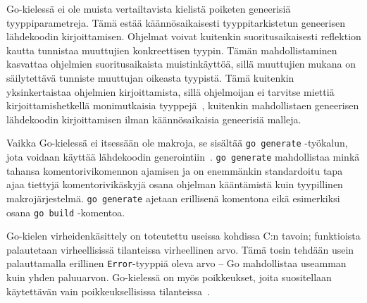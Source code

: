Go-kielessä ei ole muista vertailtavista kielistä poiketen geneerisiä
tyyppiparametreja. Tämä estää käännösaikaisesti tyyppitarkistetun geneerisen
lähdekoodin kirjoittamisen. Ohjelmat voivat kuitenkin suoritusaikaisesti
reflektion kautta tunnistaa muuttujien konkreettisen tyypin. Tämän
mahdollistaminen kasvattaa ohjelmien suoritusaikaista muistinkäyttöä, sillä
muuttujien mukana on säilytettävä tunniste muuttujan oikeasta tyypistä. Tämä
kuitenkin yksinkertaistaa ohjelmien kirjoittamista, sillä ohjelmoijan ei
tarvitse miettiä kirjoittamishetkellä monimutkaisia
tyyppejä~\citep[esim.][kalvo 8]{gohistory}, kuitenkin mahdollistaen geneerisen
lähdekoodin kirjoittamisen ilman käännösaikaisia geneerisiä malleja.


Vaikka Go-kielessä ei itsessään ole makroja, se sisältää \texttt{go~generate}
-työkalun, jota voidaan käyttää lähdekoodin generointiin~\citep{gogenerate}.
\texttt{go~generate} mahdollistaa minkä tahansa komentorivikomennon ajamisen
ja on enemmänkin standardoitu tapa ajaa tiettyjä komentorivikäskyjä osana
ohjelman kääntämistä kuin tyypillinen makrojärjestelmä.
\texttt{\mbox{go~generate}} ajetaan erillisenä komentona eikä esimerkiksi osana
\texttt{\mbox{go~build}} -komentoa.



Go-kielen virheidenkäsittely on toteutettu useissa kohdissa C:n tavoin;
funktioista palautetaan virheellisissä tilanteissa virheellinen arvo. Tämä
tosin tehdään usein palauttamalla erillinen \texttt{Error}-tyyppiä oleva arvo
-- Go mahdollistaa useamman kuin yhden paluuarvon. Go-kielessä on myös
poikkeukset, joita suositellaan käytettävän vain poikkeuksellisissa
tilanteissa~\citep{effectivego}.

